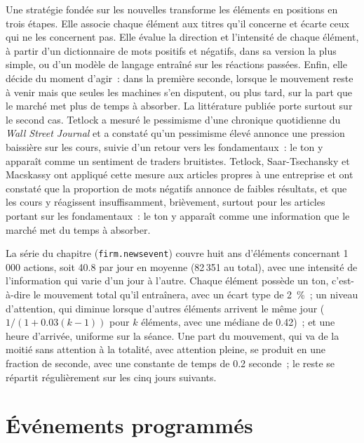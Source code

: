 Une stratégie fondée sur les nouvelles transforme les éléments en positions en trois étapes. Elle associe chaque élément aux titres qu'il concerne et écarte ceux qui ne les concernent pas.
Elle évalue la direction et l'intensité de chaque élément, à partir d'un dictionnaire de mots positifs et négatifs, dans sa version la plus simple, ou d'un modèle
de langage entraîné sur les réactions passées. Enfin, elle décide du moment d'agir~: dans la première seconde, lorsque le mouvement reste à venir mais que seules les machines s'en disputent, ou plus tard, sur la part
que le marché met plus de temps à absorber. La littérature publiée porte surtout sur le second cas. Tetlock a mesuré le pessimisme d'une chronique quotidienne du \emph{Wall Street
Journal} et a constaté qu'un pessimisme élevé annonce une pression baissière sur les cours, suivie d'un retour vers les fondamentaux~: le ton y apparaît comme un sentiment de traders bruitistes.
Tetlock, Saar-Tsechansky et Macskassy ont appliqué cette mesure aux articles propres à une entreprise et ont constaté que la proportion de mots négatifs annonce de faibles résultats,
et que les cours y réagissent insuffisamment, brièvement, surtout pour les articles portant sur les fondamentaux~: le ton y apparaît comme une information que le marché met du temps à absorber.

La série du chapitre (\texttt{firm.newsevent}) couvre huit ans d'éléments concernant 1\,000 actions, soit 40.8 par jour en moyenne (82\,351 au total), avec une intensité de l'information
qui varie d'un jour à l'autre. Chaque élément possède un ton, c'est-à-dire le mouvement total qu'il entraînera, avec un écart type de 2~\%~; un niveau d'attention, qui diminue
lorsque d'autres éléments arrivent le même jour ($1/(1+0.03(k-1))$ pour $k$ éléments, avec une médiane de 0.42)~; et une heure d'arrivée, uniforme sur la séance. Une part du mouvement, qui va de la moitié
sans attention à la totalité, avec attention pleine, se produit en une fraction de seconde, avec une constante de temps de 0.2 seconde~; le reste se répartit
régulièrement sur les cinq jours suivants.

\section{Événements programmés}

